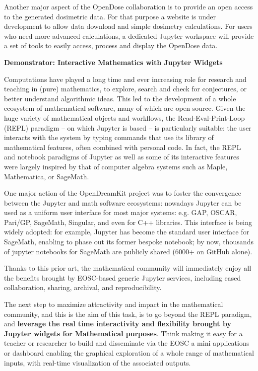   Another major aspect of the OpenDose collaboration is to provide an open
  access to the generated dosimetric data. For that purpose a website is under
  development to allow data download and simple dosimetry calculations. For
  users who need more advanced calculations, a dedicated Jupyter workspace will
  provide a set of tools to easily access, process and display the OpenDose
  data.

\medskip
\textbf{Demonstrator: Interactive Mathematics with Jupyter Widgets}


  Computations have played a long time and ever increasing role for
  research and teaching in (pure) mathematics, to explore, search and
  check for conjectures, or better understand algorithmic ideas. This
  led to the development of a whole ecosystem of mathematical
  software, many of which are open source. Given the huge variety of
  mathematical objects and workflows, the Read-Eval-Print-Loop (REPL)
  paradigm -- on which Jupyter is based -- is particularly suitable:
  the user interacts with the system by typing commands that use its
  library of mathematical features, often combined with personal code.
  In fact, the REPL and notebook paradigms of Jupyter as well as some
  of its interactive features were largely inspired by that of
  computer algebra systems such as Maple, Mathematica, or SageMath.

  One major action of the OpenDreamKit project was to foster the
  convergence between the Jupyter and math software ecosystems:
  nowadays Jupyter can be used as a uniform user interface for most
  major systems: e.g. GAP, OSCAR, Pari/GP, SageMath, Singular, and
  even for C++ libraries. This interface is being widely adopted: for
  example, Jupyter has become the standard user interface for
  SageMath, enabling to phase out its former bespoke notebook; by now,
  thousands of jupyter notebooks for SageMath are publicly shared
  (6000+ on GitHub alone).

  Thanks to this prior art, the mathematical community will
  immediately enjoy all the benefits brought by EOSC-based generic
  Jupyter services, including eased collaboration, sharing, archival,
  and reproducibility.

  The next step to maximize attractivity and impact in the
  mathematical community, and this is the aim of this task, is to go
  beyond the REPL paradigm, and \textbf{leverage the real time
    interactivity and flexibility brought by Jupyter widgets for
    Mathematical purposes}. Think making it easy for a teacher or
  researcher to build and disseminate via the EOSC a mini applications
  or dashboard enabling the graphical exploration of a whole range of
  mathematical inputs, with real-time visualization of the associated
  outputs.

